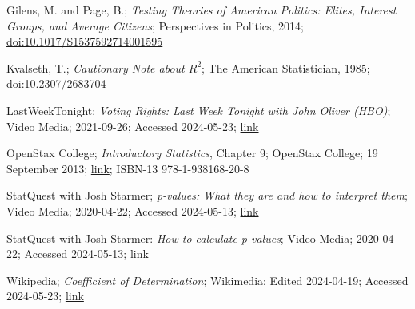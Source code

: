 \begin{thebibliography}{9}
	 Gilens, M. and Page, B.; \textit{Testing Theories of American Politics:	Elites, Interest Groups, and Average Citizens}; Perspectives in Politics, 2014; \href{https://doi.org/10.1017/S1537592714001595}{doi:10.1017/S1537592714001595}
	
	 Kvalseth, T.; \textit{Cautionary Note about $R^2$}; The American Statistician, 1985; \href{https://sci-hub.ru/https://doi.org/10.2307/2683704}{doi:10.2307/2683704}
	
	 LastWeekTonight; \textit{Voting Rights: Last Week Tonight with John Oliver (HBO)}; Video Media; 2021-09-26; Accessed 2024-05-23; \href{https://www.youtube.com/watch?v=EN9OdruH_qM}{link}
	
	 OpenStax College; \textit{Introductory Statistics}, Chapter 9; OpenStax College; 19 September 2013; \href{http://cnx.org/content/col11562/latest/}{link}; ISBN-13 978-1-938168-20-8
	
	 StatQuest with Josh Starmer; \textit{p-values: What they are and how to interpret them}; Video Media; 2020-04-22; Accessed 2024-05-13; \href{https://youtu.be/vemZtEM63GY?si=16kgerT8beT_EkOc}{link}
	
	 StatQuest with Josh Starmer: \textit{How to calculate p-values}; Video Media; 2020-04-22; Accessed 2024-05-13; \href{https://youtu.be/JQc3yx0-Q9E?si=M0vKNOTDjNuImq0k}{link}

	
	 Wikipedia; \textit{Coefficient of Determination}; Wikimedia; Edited 2024-04-19; Accessed 2024-05-23; \href{https://en.wikipedia.org/wiki/Coefficient_of_determination}{link}
\end{thebibliography}
